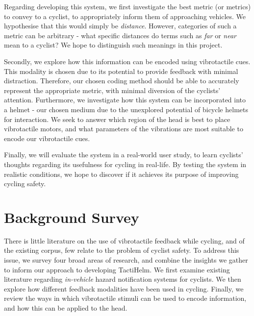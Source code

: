 \documentclass{interim}
\begin{document}
Regarding developing this system, we first investigate the best metric (or metrics) to convey to a cyclist, to appropriately inform them of approaching vehicles. We hypothesise that this would simply be \textit{distance}. However, categories of such a metric can be arbitrary - what specific distances do terms such as \textit{far} or \textit{near} mean to a cyclist? We hope to distinguish such meanings in this project.

Secondly, we explore how this information can be encoded using vibrotactile cues. This modality is chosen due to its potential to provide feedback with minimal distraction. Therefore, our chosen coding method should be able to accurately represent the appropriate metric, with minimal diversion of the cyclists' attention. Furthermore, we investigate how this system can be incorporated into a helmet - our chosen medium due to the unexplored potential of bicycle helmets for interaction. We seek to answer which region of the head is best to place vibrotactile motors, and what parameters of the vibrations are most suitable to encode our vibrotactile cues.

Finally, we will evaluate the system in a real-world user study, to learn cyclists' thoughts regarding its usefulness for cycling in real-life. By testing the system in realistic conditions, we hope to discover if it achieves its purpose of improving cycling safety.


\section{Background Survey}
There is little literature on the use of vibrotactile feedback while cycling, and of the existing corpus, few relate to the problem of cyclist safety. To address this issue, we survey four broad areas of research, and combine the insights we gather to inform our approach to developing TactiHelm. We first examine existing literature regarding \textit{in-vehicle} hazard notification systems for cyclists. We then explore how different feedback modalities have been used in cycling. Finally, we review the ways in which vibrotactile stimuli can be used to encode information, and how this can be applied to the head.
\end{document}
